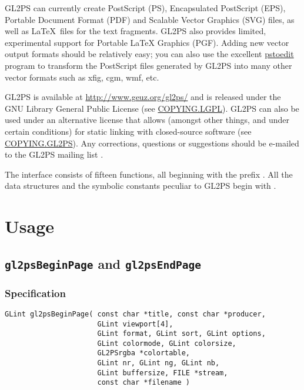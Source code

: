 GL2PS can currently create PostScript (PS), Encapsulated PostScript
(EPS), Portable Document Format (PDF) and Scalable Vector Graphics (SVG)
files, as well as \LaTeX\ files for the text fragments. GL2PS also
provides limited, experimental support for Portable LaTeX Graphics
(PGF). Adding new vector output formats should be relatively easy; you
can also use the excellent \href{http://www.pstoedit.net}{pstoedit}
program to transform the PostScript files generated by GL2PS into many
other vector formats such as xfig, cgm, wmf, etc.

GL2PS is available at \url{http://www.geuz.org/gl2ps/} and is released under
the GNU Library General Public License (see
\href{http://www.geuz.org/gl2ps/COPYING.LGPL}{COPYING.LGPL}). GL2PS can also
be used under an alternative license that allows (amongst other things, and
under certain conditions) for static linking with closed-source software
(see \href{http://www.geuz.org/gl2ps/COPYING.GL2PS}{COPYING.GL2PS}). Any
corrections, questions or suggestions should be e-mailed to the GL2PS
mailing list .

The interface consists of fifteen functions, all beginning with the
prefix . All the data structures and the symbolic constants
peculiar to GL2PS begin with .

\section{Usage}


\subsection{\texttt{gl2psBeginPage} and \texttt{gl2psEndPage}}
\label{sec:gl2psBeginPage}

\subsubsection{Specification}

\begin{verbatim}
GLint gl2psBeginPage( const char *title, const char *producer,
                      GLint viewport[4],
                      GLint format, GLint sort, GLint options, 
                      GLint colormode, GLint colorsize, 
                      GL2PSrgba *colortable, 
                      GLint nr, GLint ng, GLint nb, 
                      GLint buffersize, FILE *stream,
                      const char *filename )
\end{verbatim}

